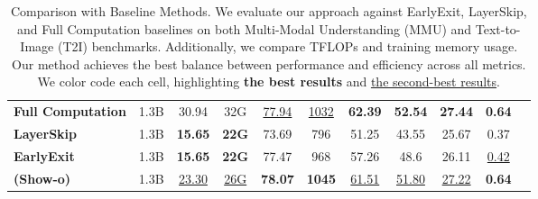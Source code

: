 \begin{table*}[t]
{\begin{tabular}{llccccccccc}
             

            \textbf{Full Computation} & 1.3B & 30.94 & 32G & \underline{77.94} & \underline{1032} & \textbf{62.39} & \textbf{52.54} & \textbf{27.44} & \textbf{0.64}\\  
             \textbf{LayerSkip} &1.3B  & \textbf{15.65}& \textbf{22G}& 73.69 & 796 & 51.25 & 43.55 &25.67 &  0.37\\      
             \textbf{EarlyExit} & 1.3B & \textbf{15.65} & \textbf{22G}& 77.47 & 968  &  57.26 & 48.6 & 26.11 & \underline{0.42} \\  
             
             \textbf{\method{}(Show-o)} & 1.3B & \underline{23.30}& \underline{26G} & \textbf{78.07} & \textbf{1045} & \underline{61.51} &  \underline{51.80} & \underline{27.22}  & \textbf{0.64}\\   
            
        \bottomrule

\end{tabular}
}

\caption{Comparison with Baseline Methods. We evaluate our approach against EarlyExit, LayerSkip, and Full Computation baselines on both Multi-Modal Understanding (MMU) and Text-to-Image (T2I) benchmarks. Additionally, we compare TFLOPs and training memory usage. Our method achieves the best balance between performance and efficiency across all metrics. We color code each cell, highlighting \textbf{the best results} and \underline{the second-best results}.}
\label{tab:table_baselines}
\end{table*}
